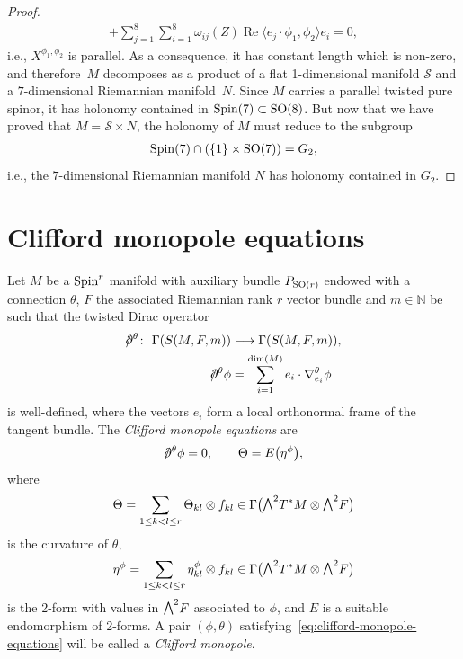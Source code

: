 \documentclass[10pt,a4paper]{amsart}
\newcommand{\ext}{\raise1pt\hbox{\small$\bigwedge$}}
\newcommand{\dirac}{/\kern-5pt\partial}
\newcommand{\lra}{\longrightarrow}
\numberwithin{equation}{section}
\begin{document}
\begin{proof}
\begin{gather*}
 + \sum_{j=1}^8 \sum_{i=1}^8\omega_{ij}(Z)\operatorname{Re}\langle e_j\cdot \phi_1,\phi_2\rangle e_i
 = 0,
\end{gather*}
i.e., $X^{\phi_1,\phi_2}$ is parallel. As a consequence, it has constant length which is non-zero, and therefore~$M$ decomposes as a product of a flat 1-dimensional manifold $\mathcal{S}$ and a $7$-dimensional Riemannian manifold~$N$. Since $M$ carries a parallel twisted pure spinor, it has holonomy contained in ${\rm Spin}(7)\subset {\rm SO}(8)$. But now that we have proved that $M=\mathcal{S}\times N$, the holonomy of $M$ must reduce to the subgroup
\begin{gather*}{\rm Spin}(7)\cap (\{1\}\times {\rm SO}(7)) =G_2, \end{gather*}
i.e., the $7$-dimensional Riemannian manifold $N$ has holonomy contained in $G_2$.
\end{proof}

\section{Clifford monopole equations}\label{sec:Clifford-monopoles}

Let $M$ be a ${\rm Spin}^r$ manifold with auxiliary bundle $P_{{\rm SO}(r)}$ endowed with a connection $\theta$, $F$ the associated Riemannian rank $r$ vector bundle and $m\in\mathbb{N}$ be such that the twisted Dirac operator
\begin{align*}
\dirac^\theta\colon \ \Gamma(S(M,F,m))&\lra \Gamma(S(M,F,m)),\\
\dirac^\theta\phi &= \sum_{i=1}^{\dim(M)} e_i\cdot \nabla_{e_i}^\theta \phi
\end{align*}
is well-defined, where the vectors $e_i$ form a local orthonormal frame of the tangent bundle. The {\em Clifford monopole equations} are
\begin{gather}
 \dirac^\theta\phi = 0,\qquad \Theta = E\big(\eta^\phi\big),\label{eq:clifford-monopole-equations}
\end{gather}
where
\begin{gather*}
 \Theta = \sum_{1\leq k<l \leq r} \Theta_{kl}\otimes f_{kl} \in \Gamma\big(\ext^2T^*M\otimes \ext^2F\big)
\end{gather*}
is the curvature of $\theta$,
\begin{gather*}
 \eta^\phi = \sum_{1\leq k<l \leq r} \eta_{kl}^\phi\otimes f_{kl} \in \Gamma\big(\ext^2T^*M\otimes \ext^2F\big)
\end{gather*}
is the 2-form with values in $\ext^2 F$ associated to $\phi$, and $E$ is a suitable endomorphism of 2-forms. A pair $(\phi,\theta)$ satisfying~\eqref{eq:clifford-monopole-equations} will be called a {\em Clifford monopole}.
\end{document}
